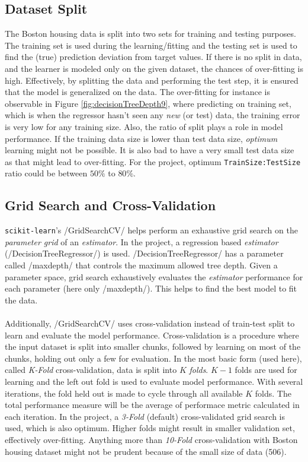 \documentclass{article}
\begin{document}
	\subsection{Dataset Split}	 
	The Boston housing data is split into two sets for training and testing purposes. The training set is used during the learning/fitting and the testing set is used to find the (true) prediction deviation from target values. If there is no split in data, and the learner is modeled only on the given dataset, the chances of over-fitting is high. Effectively, by splitting the data and performing the test step, it is ensured that the model is generalized on the data. The over-fitting for instance is observable in Figure \ref{fig:decisionTreeDepth9}, where predicting on training set, which is when the regressor hasn't seen any \emph{new} (or test) data, the training error is very low for any training size. Also, the ratio of split plays a role in model performance. If the training data size is lower than test data size, \emph{optimum} learning might not be possible. It is also bad to have a very small test data size as that might lead to over-fitting. For the project, optimum \texttt{TrainSize:TestSize} ratio could be between $50\%$ to $80\%$.
	\subsection{Grid Search and Cross-Validation}
	\texttt{scikit-learn}'s \pyinl/GridSearchCV/ helps perform an exhaustive grid search on the \emph{parameter grid} of an \emph{estimator}. In the project, a regression based \emph{estimator} (\pyinl/DecisionTreeRegressor/) is used. \pyinl/DecisionTreeRegressor/ has a parameter called \pyinl/maxdepth/ that controls the maximum allowed tree depth. Given a parameter space, grid search exhaustively evaluates the \emph{estimator} performance for each parameter (here only \pyinl/maxdepth/). This helps to find the best model to fit the data. 
	\paragraph{}Additionally, \pyinl/GridSearchCV/ uses cross-validation instead of train-test split to learn and evaluate the model performance. Cross-validation is a procedure where the input dataset is split into smaller chunks, followed by learning on most of the chunks, holding out only a few for evaluation. In the most basic form (used here), called \emph{K-Fold} cross-validation, data is split into $K$ \emph{folds}. $K-1$ folds are used for learning and the left out fold is used to evaluate model performance. With several iterations, the fold held out is made to cycle through all available $K$ folds. The total performance measure will be the average of performace metric calculated in each iteration. In the project, a \emph{3-Fold} (default) cross-validated grid search is used, which is also optimum. Higher folds might result in smaller validation set, effectively over-fitting. Anything more than \emph{10-Fold} cross-validation with Boston housing dataset might not be prudent because of the small size of data (506).
\end{document}
